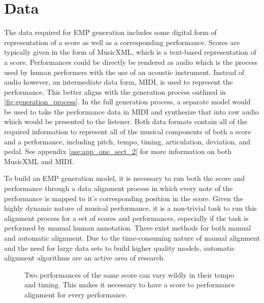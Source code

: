 \section{Data}
The data required for EMP generation includes some digital form of representation of a score as well as a corresponding performance. Scores are typically given in the form of MusicXML, which is a text-based representation of a score. Performances could be directly be rendered as audio which is the process used by human performers with the use of an acoustic instrument. Instead of audio however, an intermediate data form, MIDI, is used to represent the performance. This better aligns with the generation process outlined in \ref{fig:generation_process}. In the full generation process, a separate model would be used to take the performance data in MIDI and synthesize that into raw audio which would be presented to the listener. Both data formats contain all of the required information to represent all of the musical components of both a score and a performance, including pitch, tempo, timing, articulation, deviation, and pedal. See appendix \ref{ase:app_one_sect_2} for more information on both MusicXML and MIDI. 

To build an EMP generation model, it is necessary to run both the score and performance through a data alignment process in which every note of the performance is mapped to it's corresponding position in the score. Given the highly dynamic nature of musical performance, it is a non-trivial task to run this alignment process for a set of scores and performances, especially if the task is performed by manual human annotation. There exist methods for both manual and automatic alignment. Due to the time-consuming nature of manual alignment and the need for large data sets to build higher quality models, automatic alignment algorithms are an active area of research.

\begin{figure}
    \centering
    \caption{Two performances of the same score can vary wildly in their tempo and timing. This makes it necessary to have a score to performance alignment for every performance. }
    \label{fig:alignemnt}
\end{figure}

